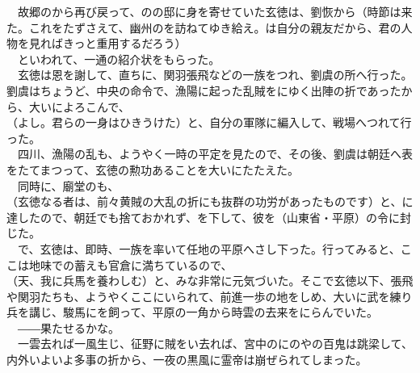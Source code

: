 \documentclass[
  paper=a5,
  fontsize=10pt,
  jafontsize=9.5pt,
  tate,                  %
  open_bracket_pos=nibu, %
]{jlreq}
\begin{document}
　故郷のから再び戻って、のの邸に身を寄せていた玄徳は、劉恢から（時節は来た。これをたずさえて、幽州のを訪ねてゆき給え。は自分の親友だから、君の人物を見ればきっと重用するだろう）\\


　といわれて、一通の紹介状をもらった。\\


　玄徳は恩を謝して、直ちに、関羽張飛などの一族をつれ、劉虞の所へ行った。劉虞はちょうど、中央の命令で、漁陽に起った乱賊をにゆく出陣の折であったから、大いによろこんで、\\


（よし。君らの一身はひきうけた）と、自分の軍隊に編入して、戦場へつれて行った。\\


　四川、漁陽の乱も、ようやく一時の平定を見たので、その後、劉虞は朝廷へ表をたてまつって、玄徳の勲功あることを大いにたたえた。\\


　同時に、廟堂のも、\\


（玄徳なる者は、前々黄賊の大乱の折にも抜群の功労があったものです）と、に達したので、朝廷でも捨ておかれず、を下して、彼を（山東省・平原）の令に封じた。\\


　で、玄徳は、即時、一族を率いて任地の平原へさし下った。行ってみると、ここは地味での蓄えも官倉に満ちているので、\\


（天、我に兵馬を養わしむ）と、みな非常に元気づいた。そこで玄徳以下、張飛や関羽たちも、ようやくここにいられて、前進一歩の地をしめ、大いに武を練り兵を講じ、駿馬にを飼って、平原の一角から時雲の去来をにらんでいた。\\


　――果たせるかな。\\


　一雲去れば一風生じ、征野に賊をい去れば、宮中のにのやの百鬼は跳梁して、内外いよいよ多事の折から、一夜の黒風に霊帝は崩ぜられてしまった。\\
\end{document}
